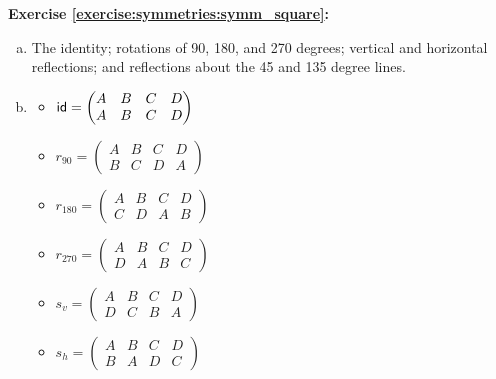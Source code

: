 \noindent\textbf{Exercise \ref{exercise:symmetries:symm_square}:}
\begin{enumerate}[(a)]
\item
The identity; rotations of 90, 180, and 270 degrees; vertical and horizontal reflections; and reflections about the 45 and 135 degree lines.

\item
	\begin{multicols}{2}
	\begin{itemize}
	\item
	$\sf{id}=\begin{pmatrix}
	A & B & C & D\\
	A & B & C & D
	\end{pmatrix}$
	
	\item
	$r_{90}=\begin{pmatrix}
	A & B & C & D\\
	B & C & D & A
	\end{pmatrix}$
	
	\item
	$r_{180}=\begin{pmatrix}
	A & B & C & D\\
	C & D & A & B
	\end{pmatrix}$
	
	\item
	$r_{270}=\begin{pmatrix}
	A & B & C & D\\
	D & A & B & C
	\end{pmatrix}$
	
	\item
	$s_{v}=\begin{pmatrix}
	A & B & C & D\\
	D & C & B & A
	\end{pmatrix}$
	
	\item
	$s_{h}=\begin{pmatrix}
	A & B & C & D\\
	B & A & D & C
	\end{pmatrix}$
	

\end{itemize}
\end{multicols}
\end{enumerate}
